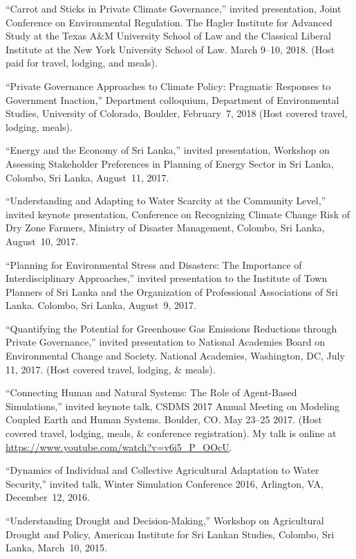 \item ``Carrot and Sticks in Private Climate Governance,'' invited presentation, Joint Conference on Environmental Regulation. The Hagler Institute for Advanced Study at the Texas A\&M University School of Law and the Classical Liberal Institute at the New York University School of Law. March 9--10, 2018. (Host paid for travel, lodging, and meals).
\item ``Private Governance Approaches to Climate Policy: Pragmatic Responses to Government Inaction,'' Department colloquium, Department of Environmental Studies, University of Colorado, Boulder, February~7, 2018 (Host covered travel, lodging, meals).
\item ``Energy and the Economy of Sri Lanka,'' invited presentation, Workshop on Assessing Stakeholder Preferences in Planning of Energy Sector in Sri Lanka, Colombo, Sri Lanka, August~11, 2017.
\item ``Understanding and Adapting to Water Scarcity at the Community Level,'' invited keynote presentation, Conference on Recognizing Climate Change Risk of Dry Zone Farmers, Ministry of Disaster Management, Colombo, Sri Lanka, August~10, 2017.
\item ``Planning for Environmental Stress and Disasters: The Importance of Interdisciplinary Approaches,'' invited presentation to the Institute of Town Planners of Sri Lanka and the Organization of Professional Associations of Sri Lanka. Colombo, Sri Lanka, August~9, 2017.
\item ``Quantifying the Potential for Greenhouse Gas Emissions Reductions through Private Governance,'' invited presentation to National Academies Board on Environmental Change and Society. National Academies, Washington, DC, July 11, 2017. (Host covered travel, lodging, \& meals).
\item  ``Connecting Human and Natural Systems: The Role of Agent-Based Simulations,'' invited keynote talk, CSDMS 2017 Annual Meeting on Modeling Coupled Earth and Human Systems. Boulder, CO. May 23--25 2017. (Host covered travel, lodging, meals, \& conference registration). My talk is online at \url{https://www.youtube.com/watch?v=v6i5_P_OOcU}.
\item  ``Dynamics of Individual and Collective Agricultural Adaptation to Water Security,'' invited talk, Winter Simulation Conference 2016, Arlington, VA, December~12, 2016.
\item ``Understanding Drought and Decision-Making,'' Workshop on Agricultural Drought and Policy, American Institute for Sri Lankan Studies, Colombo, Sri Lanka, March~10, 2015.
